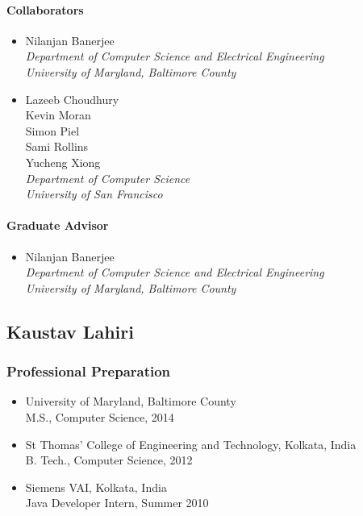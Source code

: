       \paragraph{Collaborators}
	\begin{itemize}
          \item Nilanjan Banerjee\\
            \textit{Department of Computer Science and Electrical Engineering
              \\University of Maryland, Baltimore County}
          \item Lazeeb Choudhury\\
            Kevin Moran\\
            Simon Piel\\
            Sami Rollins\\
            Yucheng Xiong\\
            \textit{Department of Computer Science\\University of San
	      Francisco}
        \end{itemize}
      \paragraph{Graduate Advisor}
	\begin{itemize}
          \item Nilanjan Banerjee\\
            \textit{Department of Computer Science and Electrical Engineering\\
              University of Maryland, Baltimore County}
        \end{itemize}
        
  \subsection{Kaustav Lahiri}
    \subsubsection{Professional Preparation}
      \begin{itemize}
        \item University of Maryland, Baltimore County 
          \\ M.S., Computer Science, 2014
        \item St Thomas' College of Engineering and Technology, Kolkata, India
          \\ B. Tech., Computer Science, 2012
        \item Siemens VAI, Kolkata, India
          \\ Java Developer Intern, Summer 2010
      \end{itemize}
